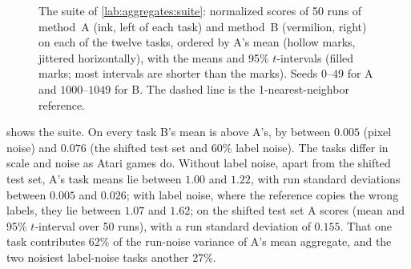 \begin{refsection}
\begin{figure}[t]
\begin{fullwidth}
\centering
{}
\caption{The suite of \cref{lab:aggregates:suite}: normalized scores of 50 runs of method~A (ink, left of each task) and method~B (vermilion, right) on each of the twelve tasks, ordered by A's mean (hollow marks, jittered horizontally), with the means and 95\% $t$-intervals (filled marks; most intervals are shorter than the marks). Seeds $0$--$49$ for A and $1000$--$1049$ for B. The dashed line is the 1-nearest-neighbor reference.}\label{fig:aggregates:tasks}
\end{fullwidth}
\end{figure}

 shows the suite. On every task B's mean is above A's, by between $0.005$ (pixel noise) and $0.076$ (the shifted test set and 60\% label noise). The tasks differ in scale and noise as Atari games do. Without label noise, apart from the shifted test set, A's task means lie between $1.00$ and $1.22$, with run standard deviations between $0.005$ and $0.026$; with label noise, where the reference copies the wrong labels, they lie between $1.07$ and $1.62$; on the shifted test set A scores  (mean and 95\% $t$-interval over 50 runs), with a run standard deviation of $0.155$. That one task contributes 62\% of the run-noise variance of A's mean aggregate, and the two noisiest label-noise tasks another 27\%.


\end{refsection}
